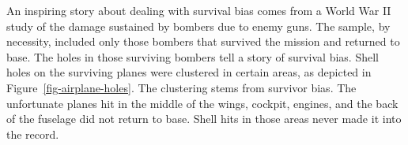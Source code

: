 \documentclass[
  letterpaper,
  DIV=11,
  numbers=noendperiod,
  oneside]{scrartcl}
\begin{document}
\begin{tcolorbox}[enhanced jigsaw, colbacktitle=quarto-callout-note-color!10!white, opacityback=0, breakable, opacitybacktitle=0.6, colback=white, coltitle=black, arc=.35mm, title=\textcolor{quarto-callout-note-color}{\faInfo}\hspace{0.5em}{Examples: Returned to base}, left=2mm, colframe=quarto-callout-note-color-frame, rightrule=.15mm, bottomrule=.15mm, leftrule=.75mm, bottomtitle=1mm, toptitle=1mm, titlerule=0mm, toprule=.15mm]

An inspiring story about dealing with survival bias comes from a World
War II study of the damage sustained by bombers due to enemy guns. The
sample, by necessity, included only those bombers that survived the
mission and returned to base. The holes in those surviving bombers tell
a story of survival bias. Shell holes on the surviving planes were
clustered in certain areas, as depicted in
Figure~\ref{fig-airplane-holes}. The clustering stems from survivor
bias. The unfortunate planes hit in the middle of the wings, cockpit,
engines, and the back of the fuselage did not return to base. Shell hits
in those areas never made it into the record.

\begin{figure}[H]



\end{figure}%

\end{tcolorbox}
\end{document}
